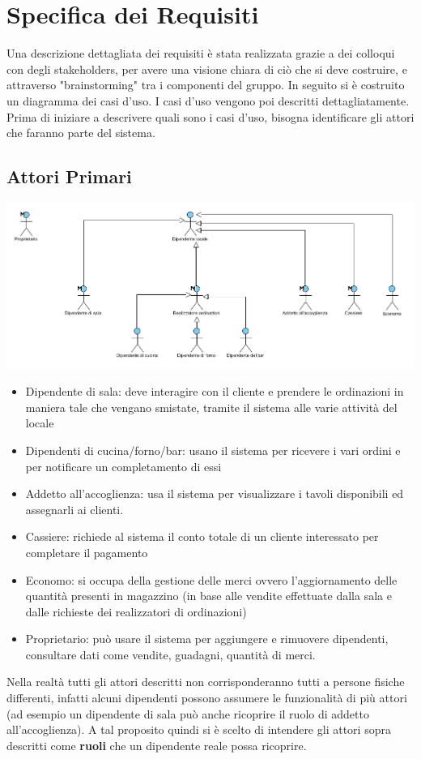 \chapter{Specifica dei Requisiti}
Una descrizione dettagliata dei requisiti è stata realizzata grazie a dei colloqui con degli stakeholders, per avere una visione chiara di ciò che si deve costruire, e attraverso "brainstorming" tra i componenti del gruppo. In seguito si è costruito un diagramma dei casi d'uso. I casi d'uso vengono poi descritti dettagliatamente.
\\Prima di iniziare a descrivere quali sono i casi d'uso, bisogna identificare gli attori che faranno parte del sistema.

\section{Attori Primari}
\includegraphics[width=\textwidth]{Immagini/AttoriPrimari.png}
\begin{itemize}
	\item Dipendente di sala: deve interagire con il cliente e prendere le ordinazioni in maniera tale che vengano smistate, tramite il sistema alle varie attività del locale
	\item Dipendenti di cucina/forno/bar: usano il sistema per ricevere i vari ordini e per notificare un completamento di essi
	\item Addetto all'accoglienza: usa il sistema per visualizzare i tavoli disponibili ed assegnarli ai clienti.
	\item Cassiere: richiede al sistema il conto totale di un cliente interessato per completare il pagamento
	\item Economo: si occupa della gestione delle merci ovvero l'aggiornamento delle quantità presenti in magazzino (in base alle vendite effettuate dalla sala e dalle richieste dei realizzatori di ordinazioni)
	\item Proprietario: può usare il sistema per aggiungere e rimuovere dipendenti, consultare dati come vendite, guadagni, quantità di merci.
\end{itemize}
Nella realtà tutti gli attori descritti non corrisponderanno tutti a persone fisiche differenti, infatti alcuni dipendenti possono assumere le funzionalità di più attori (ad esempio un dipendente di sala può anche ricoprire il ruolo di addetto all'accoglienza). A tal proposito quindi si è scelto di intendere gli attori sopra descritti come \textbf{ruoli} che un dipendente reale possa ricoprire.

